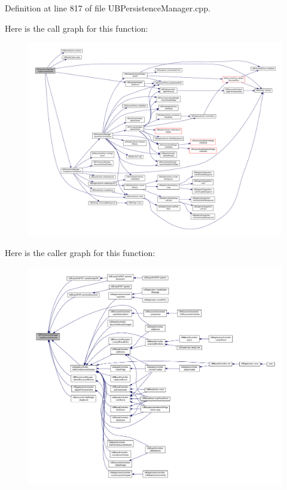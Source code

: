 Definition at line 817 of file U\-B\-Persistence\-Manager.\-cpp.



Here is the call graph for this function\-:
\nopagebreak
\begin{figure}[H]
\begin{center}
\leavevmode
\includegraphics[width=350pt]{d0/dd5/class_u_b_persistence_manager_aff136b4bcedbd0af3ee2a6ede8af6f66_cgraph}
\end{center}
\end{figure}




Here is the caller graph for this function\-:
\nopagebreak
\begin{figure}[H]
\begin{center}
\leavevmode
\includegraphics[width=350pt]{d0/dd5/class_u_b_persistence_manager_aff136b4bcedbd0af3ee2a6ede8af6f66_icgraph}
\end{center}
\end{figure}


